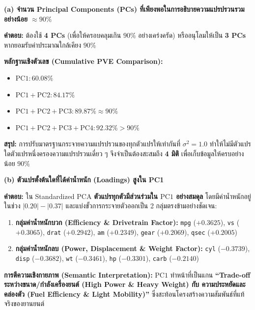 \vspace{0.6em}
\begin{tcolorbox}[colback=teal!5!white,colframe=teal!60!black,title=\textbf{คำตอบข้อ 2.2 (Question 2.2) — การวิเคราะห์ PCA แบบปรับมาตรฐาน (Standardized PCA)},halign=left,before upper={\sloppy\raggedright},boxrule=0.6pt,arc=3pt,fontupper=\small,top=3pt,bottom=3pt,left=6pt,right=6pt,unbreakable]
\noindent\textbf{\normalsize (a) จำนวน Principal Components (PCs) ที่เพียงพอในการอธิบายความแปรปรวนรวมอย่างน้อย $\approx 90\%$}\par\vspace{0.1em}
\textbf{คำตอบ:} ต้องใช้ \textbf{4 PCs} (เพื่อให้ครอบคลุมเกิน $90\%$ อย่างเคร่งครัด) หรืออนุโลมให้เป็น \textbf{3 PCs} หากยอมรับค่าประมาณใกล้เคียง $90\%$\par
\textbf{หลักฐานเชิงตัวเลข (Cumulative PVE Comparison):}
\begin{itemize}[leftmargin=1.2em, itemsep=0.5pt, topsep=0.5pt]
    \item $\text{PC1}: 60.08\%$
    \item $\text{PC1} + \text{PC2}: 84.17\%$
    \item $\text{PC1} + \text{PC2} + \text{PC3}: 89.87\% \approx 90\%$
    \item $\text{PC1} + \text{PC2} + \text{PC3} + \text{PC4}: \mathbf{92.32\%} > 90\%$
\end{itemize}
\textbf{สรุป:} การปรับมาตรฐานกระจายความแปรปรวนของทุกตัวแปรให้เท่ากันที่ $\sigma^2 = 1.0$ ทำให้ไม่มีตัวแปรใดตัวแปรหนึ่งครองความแปรปรวนเดี่ยว ๆ จึงจำเป็นต้องสะสมถึง \textbf{4 มิติ} เพื่อเก็บข้อมูลให้ครบอย่างน้อย $90\%$\par\vspace{0.2em}

\noindent\textbf{\normalsize (b) ตัวแปรตั้งต้นใดที่ได้ค่าน้ำหนัก (Loadings) สูงใน PC1}\par\vspace{0.1em}
\textbf{คำตอบ:} ใน Standardized PCA \textbf{ตัวแปรทุกตัวมีส่วนร่วมใน $\text{PC1}$ อย่างสมดุล} โดยมีค่าน้ำหนักอยู่ในช่วง $|0.20| - |0.37|$ และแบ่งขั้วการกระจายตัวออกเป็น 2 กลุ่มตรงข้ามอย่างชัดเจน:
\begin{enumerate}[leftmargin=1.2em, itemsep=0.5pt, topsep=0.5pt]
    \item \textbf{กลุ่มค่าน้ำหนักบวก (Efficiency \& Drivetrain Factor):} \texttt{mpg} ($+0.3625$), \texttt{vs} ($+0.3065$), \texttt{drat} ($+0.2942$), \texttt{am} ($+0.2349$), \texttt{gear} ($+0.2069$), \texttt{qsec} ($+0.2005$)
    \item \textbf{กลุ่มค่าน้ำหนักลบ (Power, Displacement \& Weight Factor):} \texttt{cyl} ($-0.3739$), \texttt{disp} ($-0.3682$), \texttt{wt} ($-0.3461$), \texttt{hp} ($-0.3301$), \texttt{carb} ($-0.2140$)
\end{enumerate}
\textbf{การตีความเชิงกายภาพ (Semantic Interpretation):} $\text{PC1}$ ทำหน้าที่เป็นแกน \textbf{``Trade-off ระหว่างขนาด/กำลังเครื่องยนต์ (High Power \& Heavy Weight) กับ ความประหยัดและคล่องตัว (Fuel Efficiency \& Light Mobility)''} ซึ่งสะท้อนโครงสร้างความสัมพันธ์ที่แท้จริงของยานยนต์\par\vspace{0.2em}


\end{tcolorbox}
